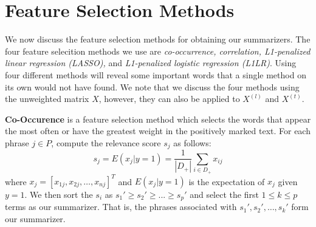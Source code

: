 \documentclass{article}
\begin{document}
%
%
%

\section{Feature Selection Methods} \label{sec:methods}
We now discuss the feature selection methods for obtaining our summarizers. The four feature selecition methods we use are \emph{co-occurrence, correlation, L1-penalized linear regression (LASSO),} and \emph{L1-penalized logistic regression (L1LR)}. Using four different methods will reveal some important words that a single method on its own would not have found. We note that we discuss the four methods using the unweighted matrix $X$, however, they can also be applied to $X^{(l)}$ and $X^{(t)}$. %

\textbf{Co-Occurence} is a feature selection method which selects the words that appear the most often or have the greatest weight in the positively marked text. For each phrase $j \in P$, compute the relevance score $s_j$ as follows:\\
\begin{equation}
s_j = E (x_j|y=1)=\frac{1}{|D_+|}{\displaystyle\sum\limits_{i \in D_+} x_{ij}}  
\end{equation}
where $x_{j}=[x_{1j}, x_{2j}, \ldots ,x_{nj}]^T$ and $E(x_j|y=1)$ is the expectation of $x_j$ given $y=1$. We then sort the $s_{i}$ as $s_1' \ge s_2' \ge ... \ge  s_p'$  and select the first $1 \leq k \leq p$ terms as our summarizer. That is, the phrases associated with $s_1', s_2', \ldots, s_k'$ form our summarizer.
\end{document}
